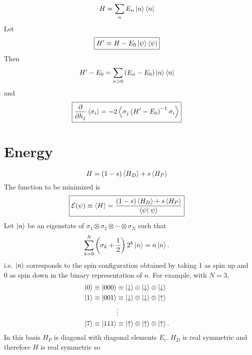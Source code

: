 \begin{equation}
  H = \sum_n E_n \left| n \right> \left< n \right|
  \label{}
\end{equation}
Let
\begin{equation}
  \boxed{
  H^{\prime} \equiv H - E_0 \left| \psi \right> \left< \psi \right|
  }
  \label{}
\end{equation}
Then
\begin{equation}
  H^{\prime} - E_0 = \sum_{n>0} \left( E_n - E_0 \right) \left| n \right> \left< n \right|
  \label{}
\end{equation}
and
\begin{equation}
  \boxed{
  \frac{\partial }{\partial h_j} \left< \sigma_i \right>
  = -2 \left< \sigma_j \left( H^{\prime} - E_0 \right)^{-1} \sigma_i \right>
  }
  \label{}
\end{equation}

\section*{Energy}
\begin{equation}
  H = (1 - s) \left< H_D \right> + s \left< H_P \right>
  \label{}
\end{equation}
The function to be minimized is
\begin{equation}
  \boxed{
  \mathcal{E}(\psi) 
  \equiv \avg{H}
  = \frac{(1-s) \avg{H_D} + s \avg{H_P}}{\braket{\psi}{\psi}}
  }
  \label{eq:energy}
\end{equation}
Let $\left| n \right>$ be an eigenstate of
$\sigma_1 \otimes \sigma_2 \otimes \cdots \otimes \sigma_N$
such that
\begin{equation}
    \sum_{k=0}^N \left( \sigma_k + \frac{1}{2} \right) 2^k \left| n \right> = n \left| n \right>.
  \label{}
\end{equation}
i.e. $\left| n \right>$ corresponds to the spin configuration obtained by taking 1
as spin up and 0 as spin down in the binary representation of $n$.
For example, with $N=3$,
\begin{align*}
  \left| 0 \right> \equiv \left| 000 \right>
  &\equiv
  \left| \downarrow \right> \otimes
  \left| \downarrow \right> \otimes
  \left| \downarrow \right> \\
  \left| 1 \right> \equiv \left| 001 \right>
  &\equiv
  \left| \downarrow \right> \otimes
  \left| \downarrow \right> \otimes
  \left| \uparrow \right> \\
  &\vdots \\
  \left| 7 \right> \equiv \left| 111 \right>
  &\equiv
  \left| \uparrow \right> \otimes
  \left| \uparrow \right> \otimes
  \left| \uparrow \right>.
  \label{}
\end{align*}
In this basis $H_P$ is diagonal with diagonal elements $E_i$. $H_D$ is real
symmetric and therefore $H$ is real symmetric so
